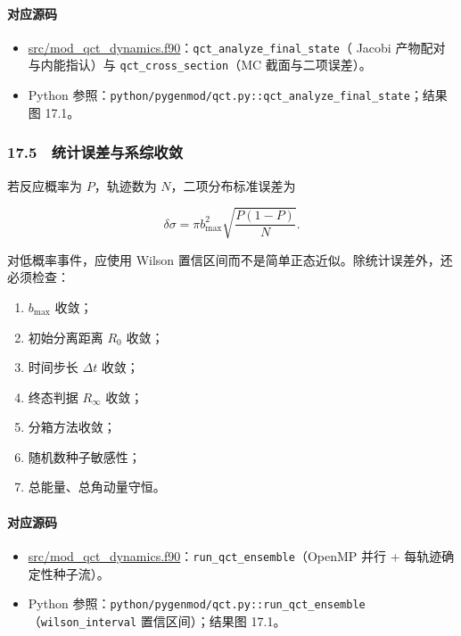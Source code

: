 \documentclass[
]{ctexbook}
\providecommand{\tightlist}{%
  \setlength{\itemsep}{0pt}\setlength{\parskip}{0pt}}
\begin{document}
\hypertarget{ux5bf9ux5e94ux6e90ux7801-76}{%
\paragraph{对应源码}\label{ux5bf9ux5e94ux6e90ux7801-76}}

\begin{itemize}
\tightlist
\item
  \href{https://github.com/l1Ha/QuantumGeneralModule/blob/main/src/mod_qct_dynamics.f90}{src/mod\_qct\_dynamics.f90}：\texttt{qct\_analyze\_final\_state}（
  Jacobi 产物配对与内能指认）与 \texttt{qct\_cross\_section}（MC
  截面与二项误差）。
\item
  Python
  参照：\texttt{python/pygenmod/qct.py::qct\_analyze\_final\_state}；结果图
  17.1。
\end{itemize}

\hypertarget{ux7edfux8ba1ux8befux5deeux4e0eux7cfbux7efcux6536ux655b}{%
\subsubsection{17.5　统计误差与系综收敛}\label{ux7edfux8ba1ux8befux5deeux4e0eux7cfbux7efcux6536ux655b}}

若反应概率为 \(P\)，轨迹数为 \(N\)，二项分布标准误差为

\[
\delta\sigma
=
\pi b_{\max}^2
\sqrt{\frac{P(1-P)}{N}}.
\]

对低概率事件，应使用 Wilson
置信区间而不是简单正态近似。除统计误差外，还必须检查：

\begin{enumerate}
\def\labelenumi{\arabic{enumi}.}
\tightlist
\item
  \(b_{\max}\) 收敛；
\item
  初始分离距离 \(R_0\) 收敛；
\item
  时间步长 \(\Delta t\) 收敛；
\item
  终态判据 \(R_{\infty}\) 收敛；
\item
  分箱方法收敛；
\item
  随机数种子敏感性；
\item
  总能量、总角动量守恒。
\end{enumerate}

\hypertarget{ux5bf9ux5e94ux6e90ux7801-77}{%
\paragraph{对应源码}\label{ux5bf9ux5e94ux6e90ux7801-77}}

\begin{itemize}
\tightlist
\item
  \href{https://github.com/l1Ha/QuantumGeneralModule/blob/main/src/mod_qct_dynamics.f90}{src/mod\_qct\_dynamics.f90}：\texttt{run\_qct\_ensemble}（OpenMP
  并行 + 每轨迹确定性种子流）。
\item
  Python
  参照：\texttt{python/pygenmod/qct.py::run\_qct\_ensemble}（\texttt{wilson\_interval}
  置信区间）；结果图 17.1。
\end{itemize}
\end{document}
